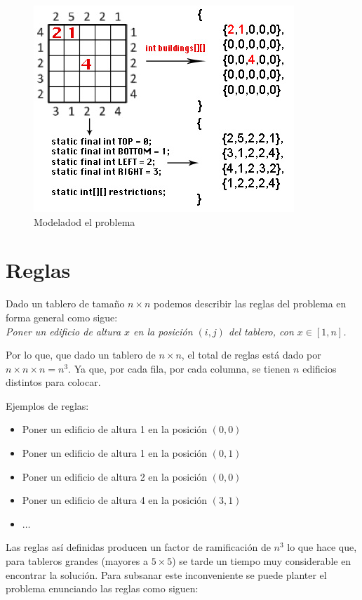\documentclass[%
	final,
	reprint,
	notitlepage,
	narroweqnarray,
	inline,
	twoside,
	invited
	]{ieee}
\begin{document}
\begin{figure}[H]
\centering
\includegraphics[scale=0.65]{./images/ModeladoSIA.jpg}
\caption{Modeladod el problema}
\label{modelado}
\end{figure}

\section{Reglas}

\par Dado un tablero de tamaño $n\times n$ podemos describir las reglas del problema en forma general como sigue:\\

\emph{Poner un edificio de altura $x$ en la posición $(i,j)$ del tablero, con $x \in [1, n]$.}\\

\par Por lo que, que dado un tablero de $n\times n$, el total de reglas está dado por $n \times {n \times n} = n^3$. Ya que, por cada fila, por cada columna, se tienen $n$ edificios distintos para colocar. 
\par Ejemplos de reglas:
\begin{itemize}
\item Poner un edificio de altura 1 en la posición $(0,0)$
\item Poner un edificio de altura 1 en la posición $(0,1)$
\item Poner un edificio de altura 2 en la posición $(0,0)$
\item Poner un edificio de altura 4 en la posición $(3,1)$
\item $\ldots$

\end{itemize}

\par Las reglas así definidas producen un factor de ramificación de $n^3$ lo que hace que, para tableros grandes (mayores a $5\times5$) se tarde un tiempo muy considerable en encontrar la solución. Para subsanar este inconveniente se puede planter el problema enunciando las reglas como siguen:\\
\end{document}
